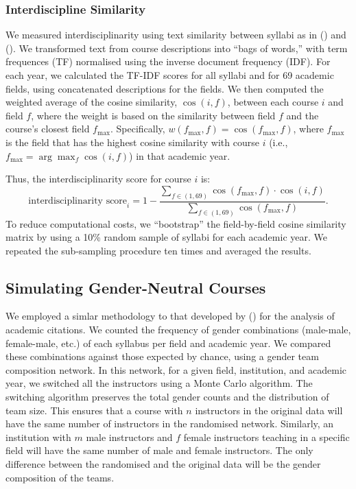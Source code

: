\documentclass[
  british,
  11pt,
]{article}
\begin{document}
\subsubsection{Interdiscipline Similarity}\label{si-interdisciplinarity}

We measured interdisciplinarity using text similarity between syllabi as in () and (). We transformed text from course descriptions into ``bags of words,'' with term frequences (TF) normalised using the inverse document frequency (IDF). For each year, we calculated the TF-IDF scores for all syllabi and for 69 academic fields, using concatenated descriptions for the fields. We then computed the weighted average of the cosine similarity, \(\cos (i, f)\), between each course \(i\) and field \(f\), where the weight is based on the similarity between field \(f\) and the course's closest field \(f_{\max}\). Specifically, \(w(f_{\max}, f) = \cos(f_{\max}, f)\), where \(f_{\max}\) is the field that has the highest cosine similarity with course \(i\) (i.e., \(f_{\max} = \arg\max_f \cos(i, f)\)) in that academic year.

Thus, the interdisciplinarity score for course \(i\) is:
\[
  \text{interdisciplinarity score}_i = 1 - \frac{\sum_{f \in (1, 69)} \cos(f_{\max}, f) \cdot \cos(i, f)}{\sum_{f \in (1, 69)} \cos(f_{\max}, f)}. 
\]
To reduce computational costs, we ``bootstrap'' the field-by-field cosine similarity matrix by using a 10\% random sample of syllabi for each academic year. We repeated the sub-sampling procedure ten times and averaged the results.

\subsection{Simulating Gender-Neutral Courses}\label{si-simulations}

We employed a simlar methodology to that developed by () for the analysis of academic citations. We counted the frequency of gender combinations (male-male, female-male, etc.) of each syllabus per field and academic year. We compared these combinations against those expected by chance, using a gender team composition network. In this network, for a given field, institution, and academic year, we switched all the instructors using a Monte Carlo algorithm. The switching algorithm preserves the total gender counts and the distribution of team size. This ensures that a course with \(n\) instructors in the original data will have the same number of instructors in the randomised network. Similarly, an institution with \(m\) male instructors and \(f\) female instructors teaching in a specific field will have the same number of male and female instructors. The only difference between the randomised and the original data will be the gender composition of the teams.
\end{document}
